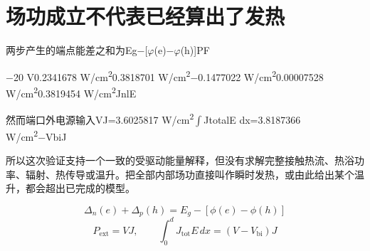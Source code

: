 \section{{\cjkfont 场功成立不代表已经算出了发热}\allowbreak{}}\label{sec:25}
{\cjkfont 两步产生的端点能差之和为}\allowbreak{}Eg−[\ensuremath{\varphi}(e)−\ensuremath{\varphi}(h)]\allowbreak{}PF\allowbreak{}
\par
−20 V\allowbreak{}0.2341678 W/cm\textsuperscript{2}\allowbreak{}0.3818701 W/cm\textsuperscript{2}\allowbreak{}−0.1477022 W/cm\textsuperscript{2}\allowbreak{}0.00007528 W/cm\textsuperscript{2}\allowbreak{}0.3819454 W/cm\textsuperscript{2}\allowbreak{}JnlE\allowbreak{}
\par
{\cjkfont 然而端口外电源输入}\allowbreak{}VJ=\allowbreak{}3.6025817 W/cm\textsuperscript{2}\allowbreak{}\ensuremath{\int}JtotalE dx=\allowbreak{}3.8187366 W/cm\textsuperscript{2}\allowbreak{}−VbiJ\allowbreak{}
\par
{\cjkfont 所以这次验证支持一个一致的受驱动能量解释，但没有求解完整接触热流、热浴功率、辐射、热传导或温升。把全部内部场功直接叫作瞬时发热，或由此给出某个温升，都会超出已完成的模型。}\allowbreak{}
\par
\begin{equation}
\Delta_n(e)+\Delta_p(h)=E_g-[\phi(e)-\phi(h)]
\label{eq:27}\end{equation}
\begin{equation}
P_{\mathrm{ext}}=VJ,\qquad\int_0^d J_{\mathrm{tot}}E\,dx=(V-V_{\mathrm{bi}})J
\label{eq:28}\end{equation}
